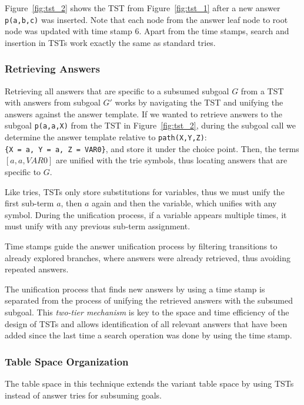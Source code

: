 Figure~\ref{fig:tst_2} shows the TST from Figure~\ref{fig:tst_1} after a new answer \texttt{p(a,b,c)} was inserted.
Note that each node from the answer leaf node to root node was updated with time stamp 6. Apart from
the time stamps, search and insertion in TSTs work exactly the same as standard tries.

\subsubsection{Retrieving Answers}

Retrieving all answers that are specific to a subsumed subgoal $G$ from a TST with answers from subgoal $G'$
works by navigating the TST and unifying the answers against the answer template.
If we wanted to retrieve answers to the subgoal \texttt{p(a,a,X)} from the TST in Figure~\ref{fig:tst_2},
during the subgoal call we determine the answer template relative to \texttt{path(X,Y,Z)}:
\texttt{\{X~=~a,~Y~=~a,~Z~=~VAR0\}},
and store it under the choice point. Then, the terms $[a, a, VAR0]$ are unified
with the trie symbols, thus locating answers that are specific to $G$.

Like tries, TSTs only store substitutions for variables, thus we must unify
the first sub-term $a$, then $a$ again and then the variable, which unifies with any symbol.
During the unification process, if a variable appears multiple times, it must unify with
any previous sub-term assignment.

Time stamps guide the answer unification process by filtering transitions to already explored branches, where
answers were already retrieved, thus avoiding repeated answers.

The unification process that finds new answers by using a time stamp is separated from the process
of unifying the retrieved answers with the subsumed subgoal. This \textit{two-tier mechanism} is key to the space and time
efficiency of the design of TSTs \cite{Johnson-99} and allows identification of all relevant answers that have
been added since the last time a search operation was done by using the time stamp.

\subsubsection{Table Space Organization}

The table space in this technique extends the variant table space by
using TSTs instead of answer tries for subsuming goals.
 
